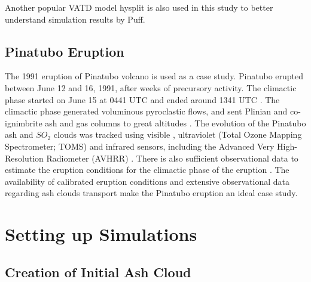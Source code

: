 \documentclass[draft,linenumbers]{agujournal2019}
\begin{document}
Another popular VATD model hysplit \citep{stein2015noaa, rolph2017real} is also used in this study to better understand simulation results by Puff.

\subsection{Pinatubo Eruption}

The 1991 eruption of Pinatubo volcano is used as a case study. Pinatubo erupted between June 12 and 16, 1991, after weeks of precursory activity. The climactic phase started on June 15 at 0441 UTC and ended around 1341 UTC \citep{holasek1996satellite}. The climactic phase generated voluminous pyroclastic flows, and sent Plinian and co-ignimbrite ash and gas columns to great altitudes \citep{scott1996pyroclastic}. The evolution of the Pinatubo ash and $SO_2$ clouds was tracked using visible \citep{holasek1996satellite}, ultraviolet (Total Ozone Mapping Spectrometer; TOMS) \citep{guo2004re} and infrared sensors, including the Advanced Very High-Resolution Radiometer (AVHRR) \citep{guo2004particles}. There is also sufficient observational data to estimate the eruption conditions for the climactic phase of the eruption \citep{suzuki2009three}. The availability of calibrated eruption conditions and extensive observational data regarding ash clouds transport make the Pinatubo eruption an ideal case study.

\section{Setting up Simulations} \label{sec:Methodology}

\subsection{Creation of Initial Ash Cloud} \label{sec:create-initial-condition}
\end{document}
